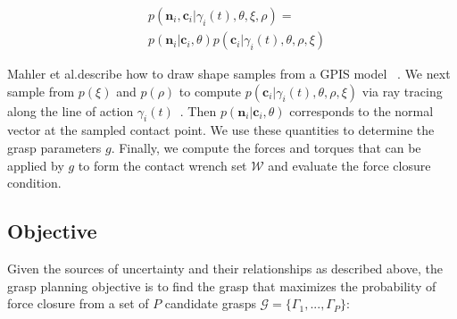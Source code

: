 \documentclass[10pt, conference]{ieeeconf}      %
\newcommand{\mG}{\mathcal{G}}
\newcommand{\mW}{\mathcal{W}}
\begin{document}
 \vspace{-2ex}
 \begin{align*}
 &p(\textbf{n}_i,\textbf{c}_i |\gamma_i(t),\theta,\xi,\rho)=\\
 &p(\textbf{n}_i|\textbf{c}_i,\theta)p(\textbf{c}_i|\gamma_i(t),\theta,\rho,\xi)
 \end{align*}

 
Mahler et al.describe how to draw shape samples from a GPIS model ~\cite{mahler2015gp}.
We next sample from $p(\xi)$ and $p(\rho)$ to compute $p(\textbf{c}_i|\gamma_i(t),\theta,\rho,\xi)$ via ray tracing along the line of action $\gamma_i(t)$~\cite{newcombe2011kinectfusion}.
Then $p(\textbf{n}_i|\textbf{c}_i,\theta)$ corresponds to the normal vector at the sampled contact point.
We use these quantities to determine the grasp parameters $g$.
Finally, we compute the forces and torques that can be applied by $g$ to form the contact wrench set $\mW$ and evaluate the force closure condition.


%



\subsection{Objective}

Given the sources of uncertainty and their relationships as described above, the grasp planning objective is to find the grasp that maximizes the probability of force closure from a set of $P$ candidate grasps $\mG = \{\Gamma_1, ..., \Gamma_P\}$:
\end{document}
